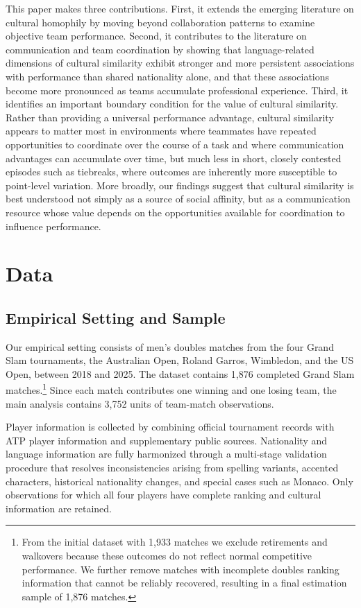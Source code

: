 \documentclass[10pt]{article}
\begin{document}
This paper makes three contributions. First, it extends the emerging literature on cultural homophily by moving beyond collaboration patterns to examine objective team performance. Second, it contributes to the literature on communication and team coordination by showing that language-related dimensions of cultural similarity exhibit stronger and more persistent associations with performance than shared nationality alone, and that these associations become more pronounced as teams accumulate professional experience. Third, it identifies an important boundary condition for the value of cultural similarity. Rather than providing a universal performance advantage, cultural similarity appears to matter most in environments where teammates have repeated opportunities to coordinate over the course of a task and where communication advantages can accumulate over time, but much less in short, closely contested episodes such as tiebreaks, where outcomes are inherently more susceptible to point-level variation. More broadly, our findings suggest that cultural similarity is best understood not simply as a source of social affinity, but as a communication resource whose value depends on the opportunities available for coordination to influence performance.
\section{Data}
\subsection{Empirical Setting and Sample}
Our empirical setting consists of men's doubles matches from the four Grand Slam tournaments, the Australian Open, Roland Garros, Wimbledon, and the US Open, between 2018 and 2025. The dataset contains 1,876 completed Grand Slam matches.\footnote{From the initial dataset with 1,933  matches we exclude retirements and walkovers because these outcomes do not reflect normal competitive performance. We further remove matches with incomplete doubles ranking information that cannot be reliably recovered, resulting in a final estimation sample of 1,876 matches.} Since each match contributes one winning and one losing team,  the main analysis contains 3,752 units of team-match observations.

Player information is collected by combining official tournament records with ATP player information and supplementary public sources. Nationality and language information are fully harmonized through a multi-stage validation procedure that resolves inconsistencies arising from spelling variants, accented characters, historical nationality changes, and special cases such as Monaco. Only observations for which all four players have complete ranking and cultural information are retained.
\end{document}

